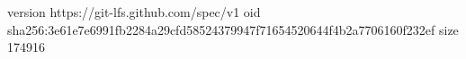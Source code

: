 version https://git-lfs.github.com/spec/v1
oid sha256:3e61e7e6991fb2284a29cfd58524379947f71654520644f4b2a7706160f232ef
size 174916

